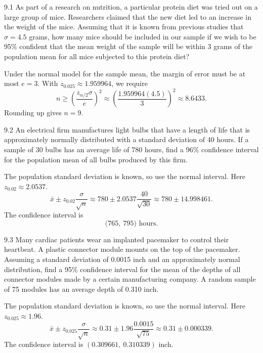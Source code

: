 \documentclass[11pt,oneside]{article}
\begin{document}

\begin{exercise}{9.1}
As part of a research on nutrition, a particular protein diet was tried out on a large group of mice. Researchers claimed that the new diet led to an increase in the weight of the mice. Assuming that it is known from previous studies that $\sigma=4.5$ grams, how many mice should be included in our sample if we wish to be 95\% confident that the mean weight of the sample will be within 3 grams of the population mean for all mice subjected to this protein diet?
\end{exercise}
\begin{solution}
Under the normal model for the sample mean, the margin of error must be at most $e=3$. With $z_{0.025}\approx 1.959964$, we require
\[
n\ge \left(\frac{z_{\alpha/2}\sigma}{e}\right)^2\approx \left(\frac{1.959964(4.5)}{3}\right)^2\approx 8.6433.
\]
Rounding up gives $\boxed{n=9}$.
\end{solution}

\begin{exercise}{9.2}
An electrical firm manufactures light bulbs that have a length of life that is approximately normally distributed with a standard deviation of 40 hours. If a sample of 30 bulbs has an average life of 780 hours, find a 96\% confidence interval for the population mean of all bulbs produced by this firm.
\end{exercise}
\begin{solution}
The population standard deviation is known, so use the normal interval. Here $z_{0.02}\approx 2.0537$.
\[
\bar x\pm z_{0.02}\frac{\sigma}{\sqrt n}\approx 780\pm 2.0537\frac{40}{\sqrt{30}}\approx 780\pm 14.998461.
\]
The confidence interval is 
\[
\boxed{\bigl(765,\ 795\bigr)}\text{ hours}.
\]
\end{solution}

\begin{exercise}{9.3}
Many cardiac patients wear an implanted pacemaker to control their heartbeat. A plastic connector module mounts on the top of the pacemaker. Assuming a standard deviation of 0.0015 inch and an approximately normal distribution, find a 95\% confidence interval for the mean of the depths of all connector modules made by a certain manufacturing company. A random sample of 75 modules has an average depth of 0.310 inch.
\end{exercise}
\begin{solution}
The population standard deviation is known, so use the normal interval. Here $z_{0.025}\approx 1.96$.
\[
\bar x\pm z_{0.025}\frac{\sigma}{\sqrt n}\approx 0.31\pm 1.96\frac{0.0015}{\sqrt{75}}\approx 0.31\pm 0.000339.
\]
The confidence interval is $\boxed{(0.309661,\ 0.310339)}$ inch.
\end{solution}
\end{document}

